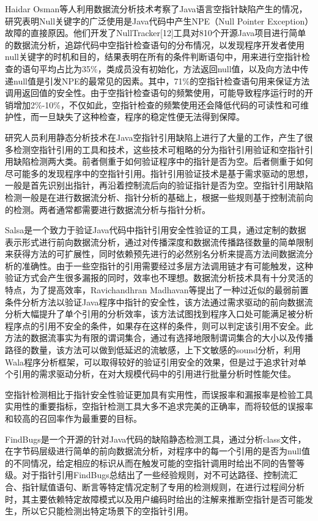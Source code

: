 Haidar Osman等人利用数据流分析技术考察了Java语言空指针缺陷产生的情况，研究表明Null关键字的广泛使用是Java代码中产生NPE（Null Pointer Exception）故障的直接原因。他们开发了NullTracker[12]工具对810个开源Java项目进行简单的数据流分析，追踪代码中空指针检查语句的分布情况，以发现程序开发者使用null关键字的时机和目的，结果表明在所有的条件判断语句中，用来进行空指针检查的语句平均占比为35\%，类成员没有初始化，方法返回null值，以及向方法中传递null值是引发NPE的最常见的因素。其中，71\%的空指针检查语句用来保证方法调用返回值的安全性。由于空指针检查语句的频繁使用，可能导致程序运行时的开销增加2\%-10\%，不仅如此，空指针检查的频繁使用还会降低代码的可读性和可维护性，而一旦缺失了这种检查，程序的稳定性便无法得到保障。

研究人员利用静态分析技术在Java空指针引用缺陷上进行了大量的工作，产生了很多检测空指针引用的工具和技术，这些技术可粗略的分为指针引用验证和空指针引用\cite{xie2007saturn}缺陷检测两大类。前者侧重于如何验证程序中的指针是否为空。后者侧重于如何尽可能多的发现程序中的空指针引用。指针引用验证技术是基于需求驱动的思想\cite{wang2015}，一般是首先识别出指针，再沿着控制流后向的验证指针是否为空。空指针引用缺陷检测一般是在进行数据流分析\cite{wangxu2015}、指针分析的基础上，根据一些规则基于控制流前向的检测。两者通常都需要进行数据流分析与指针分析。

Salsa\cite{loginov2008verifying}是一个致力于验证Java代码中指针引用安全性验证的工具，通过定制的数据表示形式进行前向数据流分析，通过对传播深度和数据流传播路径数量的简单限制来获得方法的可扩展性，同时依赖预先进行的必然别名分析来提高方法间数据流分析的准确性。由于一些空指针的引用需要经过多层方法调用链才有可能触发，这种验证方式会产生很多漏报的同时，效率也不理想。数据流分析技术具有十分灵活的特点，为了提高效率，Ravichandhran Madhavan\cite{madhavan2011null}等提出了一种过近似的最弱前置条件分析方法以验证Java程序中指针的安全性，该方法通过需求驱动的前向数据流分析大幅提升了单个引用的分析效率，该方法试图找到程序入口处可能满足被分析程序点的引用不安全的条件，如果存在这样的条件，则可以判定该引用不安全。此方法的数据流事实为有限的谓词集合，通过有选择地限制谓词集合的大小以及传播路径的数量，该方法可以做到低延迟的流敏感，上下文敏感的sound分析，利用Wala\cite{wala}程序分析框架，可以取得较好的验证引用安全的效果，但是过于追求针对单个引用的需求驱动分析，在对大规模代码中的引用进行批量分析时性能欠佳。

空指针检测相比于指针安全性验证更加具有实用性，而误报率和漏报率是检验工具实用性的重要指标，空指针检测工具大多不追求完美的正确率，而将较低的误报率和较高的召回率作为最重要的目标。

FindBugs\cite{hovemeyer2005evaluating}\cite{hovemeyer2007finding}是一个开源的针对Java代码的缺陷静态检测工具，通过分析class文件，在字节码层级进行简单的前向数据流分析，对程序中的每一个引用的是否为null值的不同情况，给定相应的标识从而在触发可能的空指针调用时给出不同的告警等级。对于指针引用FindBugs总结出了一些经验规则，对不可达路径、控制流汇合、指针赋值语句、断言等特定情况定制了专用的检测规则，在进行过程间分析时，其主要依赖特定故障模式以及用户编码时给出的注解来推断空指针是否可能发生，所以它只能检测出特定场景下的空指针引用。

